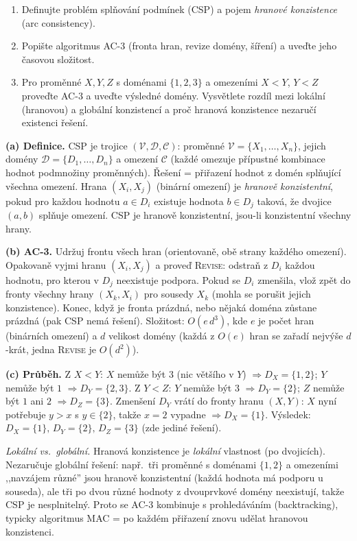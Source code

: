 \begin{zadani}
\begin{enumerate}[label=(\alph*)]
  \item {} Definujte problém splňování podmínek (CSP) a pojem \emph{hranové konzistence} (arc consistency).
  \item {} Popište algoritmus AC-3 (fronta hran, revize domény, šíření) a uveďte jeho časovou složitost.
  \item {} Pro proměnné $X,Y,Z$ s doménami $\{1,2,3\}$ a omezeními $X<Y$, $Y<Z$ proveďte AC-3 a uveďte výsledné domény. Vysvětlete rozdíl mezi lokální (hranovou) a globální konzistencí a proč hranová konzistence nezaručí existenci řešení.
\end{enumerate}
\end{zadani}

\begin{reseni}
\textbf{(a) Definice.} CSP je trojice $(\mathcal{V},\mathcal{D},\mathcal{C})$: proměnné $\mathcal{V}=\{X_1,\dots,X_n\}$, jejich domény $\mathcal{D}=\{D_1,\dots,D_n\}$ a omezení $\mathcal{C}$ (každé omezuje přípustné kombinace hodnot podmnožiny proměnných). Řešení = přiřazení hodnot z domén splňující všechna omezení. Hrana $(X_i,X_j)$ (binární omezení) je \emph{hranově konzistentní}, pokud pro každou hodnotu $a\in D_i$ existuje hodnota $b\in D_j$ taková, že dvojice $(a,b)$ splňuje omezení. CSP je hranově konzistentní, jsou-li konzistentní všechny hrany.

\textbf{(b) AC-3.} Udržuj frontu všech hran (orientovaně, obě strany každého omezení). Opakovaně vyjmi hranu $(X_i,X_j)$ a proveď \textsc{Revise}: odstraň z $D_i$ každou hodnotu, pro kterou v $D_j$ neexistuje podpora. Pokud se $D_i$ zmenšila, vlož zpět do fronty všechny hrany $(X_k,X_i)$ pro sousedy $X_k$ (mohla se porušit jejich konzistence). Konec, když je fronta prázdná, nebo nějaká doména zůstane prázdná (pak CSP nemá řešení). Složitost: $O(e\,d^3)$, kde $e$ je počet hran (binárních omezení) a $d$ velikost domény (každá z $O(e)$ hran se zařadí nejvýše $d$-krát, jedna \textsc{Revise} je $O(d^2)$).

\textbf{(c) Průběh.} Z $X<Y$: $X$ nemůže být $3$ (nic většího v $Y$) $\Rightarrow D_X=\{1,2\}$; $Y$ nemůže být $1$ $\Rightarrow D_Y=\{2,3\}$. Z $Y<Z$: $Y$ nemůže být $3$ $\Rightarrow D_Y=\{2\}$; $Z$ nemůže být $1$ ani $2$ $\Rightarrow D_Z=\{3\}$. Zmenšení $D_Y$ vrátí do fronty hranu $(X,Y)$: $X$ nyní potřebuje $y>x$ s $y\in\{2\}$, takže $x=2$ vypadne $\Rightarrow D_X=\{1\}$. Výsledek: $D_X=\{1\},\,D_Y=\{2\},\,D_Z=\{3\}$ (zde jediné řešení).

\emph{Lokální vs.\ globální.} Hranová konzistence je \emph{lokální} vlastnost (po dvojicích). Nezaručuje globální řešení: např.\ tři proměnné s doménami $\{1,2\}$ a omezeními ,,navzájem různé'' jsou hranově konzistentní (každá hodnota má podporu u souseda), ale tři po dvou různé hodnoty z dvouprvkové domény neexistují, takže CSP je nesplnitelný. Proto se AC-3 kombinuje s prohledáváním (backtracking), typicky algoritmus MAC = po každém přiřazení znovu udělat hranovou konzistenci.
\end{reseni}

